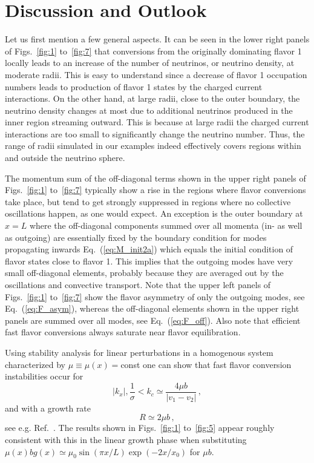 \documentclass[prd,aps]{revtex4-2}
\begin{document}
\section{Discussion and Outlook}\label{sec:sec4}
Let us first mention a few general aspects. It can be seen in the lower right panels of Figs.~\ref{fig:1} to~\ref{fig:7}
that conversions from the originally dominating flavor 1 locally leads to an increase of the number of neutrinos,
or neutrino density, at moderate radii. This is easy to understand since a decrease of flavor 1 occupation numbers leads to
production of flavor 1 states by the charged current interactions. On the other hand, at large radii, close to the outer
boundary, the neutrino density changes at most due to additional neutrinos produced in the inner region streaming
outward. This is because at large radii the charged current interactions are too small to significantly change the
neutrino number. Thus, the range of radii simulated in our examples indeed effectively covers regions within and
outside the neutrino sphere.

The momentum sum of the off-diagonal terms shown in the upper right panels of Figs.~\ref{fig:1} to~\ref{fig:7}
typically show a rise in the regions where flavor conversions take place, but tend to get strongly suppressed in regions
where no collective oscillations happen, as one would expect. An exception is the outer boundary at $x=L$ where the off-diagonal
components summed over all momenta (in- as well as outgoing) are essentially fixed by the boundary
condition for modes propagating inwards Eq.~(\ref{eq:M_init2a}) which equals the initial condition
of flavor states close to flavor 1. This implies that the outgoing modes have very small off-diagonal elements,
probably because they are averaged out by the oscillations and convective transport. Note that 
the upper left panels of Figs.~\ref{fig:1} to~\ref{fig:7} show the flavor asymmetry of only the outgoing modes,
see Eq.~(\ref{eq:F_asym}), whereas the off-diagonal elements shown in the upper right panels are summed over all modes,
see Eq.~(\ref{eq:F_off}). Also note that efficient fast flavor conversions always saturate near flavor equilibration.

Using stability analysis for linear perturbations in a homogenous system characterized by $\mu\equiv\mu(x)=$const
one can show that fast flavor conversion instabilities occur for
\begin{equation}\label{eq:stab1}
  |k_x|,\frac{1}{\sigma}<k_c\simeq\frac{4\mu b}{|v_1-v_2|}\,,
\end{equation}
and with a growth rate
\begin{equation}\label{eq:stab2}
  R\simeq2\mu b\,,
\end{equation}
see e.g. Ref.~\cite{Chakraborty:2016yeg}.
The results shown in Figs.~\ref{fig:1} to~\ref{fig:5} appear roughly consistent with this in the linear growth phase when
substituting $\mu(x)bg(x)\simeq\mu_0\sin(\pi x/L)\exp(-2x/x_0)$ for $\mu b$.
\end{document}
